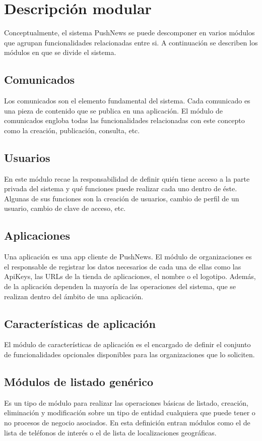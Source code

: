 \section{Descripción modular}
Conceptualmente, el sistema PushNews se puede descomponer en varios módulos que agrupan funcionalidades relacionadas entre si. A continuación se describen los módulos en que se divide el sistema.

\subsection{Comunicados}
Los comunicados son el elemento fundamental del sistema. Cada comunicado es una pieza de contenido que se publica en una aplicación. El módulo de comunicados engloba todas las funcionalidades relacionadas con este concepto como la creación, publicación, consulta, etc.

\subsection{Usuarios}
En este módulo recae la responsabilidad de definir quién tiene acceso a la parte privada del sistema y qué funciones puede realizar cada uno dentro de éste. Algunas de sus funciones son la creación de usuarios, cambio de perfil de un usuario, cambio de clave de acceso, etc.

\subsection{Aplicaciones}
Una aplicación es una app cliente de PushNews. El módulo de organizaciones es el responsable de registrar los datos necesarios de cada una de ellas como las ApiKeys, las URLs de la tienda de aplicaciones, el nombre o el logotipo. Además, de la aplicación dependen la mayoría de las operaciones del sistema, que se realizan dentro del ámbito de una aplicación.

\subsection{Características de aplicación}
El módulo de características de aplicación es el encargado de definir el conjunto de funcionalidades opcionales disponibles para las organizaciones que lo soliciten.

\subsection{Módulos de listado genérico}
Es un tipo de módulo para realizar las operaciones básicas de listado, creación, eliminación y modificación sobre un tipo de entidad cualquiera que puede tener o no procesos de negocio asociados. En esta definición entran módulos como el de lista de teléfonos de interés o el de lista de localizaciones geográficas.

